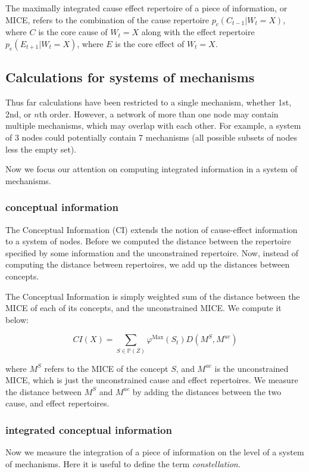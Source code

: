\begin{definition}
	{The maximally integrated cause effect repertoire of a piece of information, or MICE, refers to the combination of the cause repertoire $p_c(C_{t-1}|W_t = X)$, where $C$ is the core cause of $W_t=X$ along with the effect repertoire $p_e(E_{t+1}|W_t = X)$, where $E$ is the core effect of $W_t = X$.}
\end{definition}

\subsection{Calculations for systems of mechanisms}
Thus far calculations have been restricted to a single mechanism, whether 1st, 2nd, or $n$th order. However, a network of more than one node may contain multiple mechanisms, which may overlap with each other. For example, a system of 3 nodes could potentially contain 7 mechanisms (all possible subsets of nodes less the empty set).

Now we focus our attention on computing integrated information in a system of mechanisms. 

\subsubsection{conceptual information}
The Conceptual Information (CI) extends the notion of cause-effect information to a system of nodes. Before we computed the distance between the repertoire specified by some information and the unconstrained repertoire. Now, instead of computing the distance between repertoires, we add up the distances between concepts.

The Conceptual Information is simply weighted sum of the distance between the MICE of each of its concepts, and the unconstrained MICE. We compute it below:

\begin{equation}
\label{def:CI}
CI(X) = \sum \limits_{S \in \mathbb{P}(Z)} \varphi^{\text{Max}}(S_t) D(M^S, M^{uc})
\end{equation}

where $M^S$ refers to the MICE of the concept $S$, and $M^{uc}$ is the unconstrained MICE, which is just the unconstrained cause and effect repertoires. We measure the distance between $M^S$ and $M^{uc}$ by adding the distances between the two cause, and effect repertoires.


\subsubsection{integrated conceptual information}
Now we measure the integration of a piece of information on the level of a system of mechanisms. Here it is useful to define the term \textit{constellation}.

